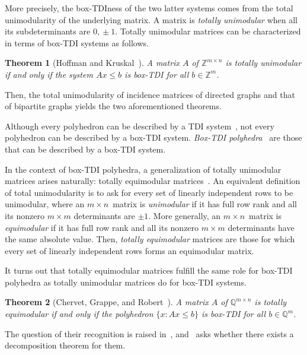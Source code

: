 \documentclass[11pt,a4paper]{amsart}
\renewcommand*{\leq}{\leqslant}
\theoremstyle{plain}
\newtheorem{theorem}{Theorem}[section]%
\theoremstyle{definition}
\begin{document}
More precisely, the box-TDIness of the two latter systems comes from the total unimodularity of the underlying matrix.
A matrix is {\em totally unimodular} when all its subdeterminants are $0,\!\pm1$.
Totally unimodular matrices can be characterized in terms of box-TDI systems as follows.

\begin{theorem}[Hoffman and Kruskal~\cite{Hoffman_Kruskal_1956}]\label{thm:Hoffman_Kruskal_1956}
	A matrix $A$ of $\mathbb{Z}^{m\times n}$ is totally unimodular if and only if the system $Ax\leq b$ is box-TDI for all $b\in\mathbb{Z}^m$.
\end{theorem}
Then, the total unimodularity of incidence matrices of directed graphs and that of bipartite graphs yields the two aforementioned theorems.
\medskip

Although every polyhedron can be described by a TDI system~\cite[{Theorem~22.6}]{Schrijver_1999}, not every polyhedron can be described by a box-TDI system.
{\em Box-TDI polyhedra}~\cite{Cook_1986} are those that can be described by a box-TDI system.

In the context of box-TDI polyhedra, a generalization of totally unimodular matrices arises naturally: totally equimodular matrices~\cite{Chervet_Grappe_Robert_2021}.
An equivalent definition of total unimodularity is to ask for every set of linearly independent rows to be unimodular, where an $m\times n$~matrix is {\em unimodular} if it has full row rank and all its nonzero $m\times m$ determinants are $\pm 1$.
More generally, an $m\times n$~matrix is {\em equimodular} if it has full row rank and all its nonzero $m\times m$ determinants have the same absolute value.
Then, {\em totally equimodular} matrices are those for which every set of linearly independent rows forms an equimodular matrix.

It turns out that totally equimodular matrices fulfill the same role for box-TDI polyhedra as totally unimodular matrices do for box-TDI systems.

\begin{theorem}[{Chervet, Grappe, and Robert~\cite[Corollary~8]{Chervet_Grappe_Robert_2021}}]\label{TEMPBI}
	A matrix $A$ of $\mathbb{Q}^{m\times n}$ is totally equimodular if and only if the polyhedron $\{x:Ax\leq b\}$ is box-TDI for all $b\in\mathbb{Q}^m$.
\end{theorem}

The question of their recognition is raised in~\cite[Open problem~1]{Chervet_Grappe_Robert_2021}, and~\cite[Open problem~3.24]{Grappe_2021} asks whether there exists a decomposition theorem for them. 
\end{document}
